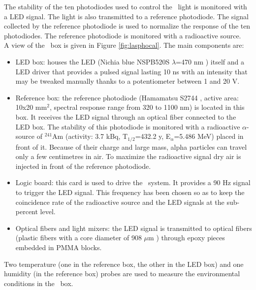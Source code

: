 The stability of the ten photodiodes used to control the \laser~light is monitored with a LED signal. The light is also transmitted to a reference photodiode. The signal collected by the reference photodiode is used to normalize the response of the ten photodiodes. The reference photodiode is monitored with a radioactive source.\\
A view of the \phocal~box is given in Figure \ref{fig:lasphocal}. The main components are:
\begin{itemize}
\item LED box: houses the LED (Nichia blue NSPB520S $\lambda$=470 nm \cite{ref:led}) itself and a LED driver that provides a pulsed signal lasting 10 ns with an intensity that may be tweaked manually thanks to a potentiometer between 1 and 20 V.
\item Reference box: the reference photodiode (Hamamatsu S2744 \cite{ref:bigphoto}, active area: 10x20 mm$^2$,  spectral response range from 320 to 1100 nm) is located in this box. It receives the LED signal through an optical fiber connected to the LED box. The stability of this photodiode is monitored with a radioactive $\alpha$-source of $^{241}$Am (activity: 3.7 kBq, T$_{1/2}$=432.2 y, E$_{\alpha}$=5.486 MeV) placed in front of it. Because of their charge and large mass, alpha particles can travel only a few centimetres in air. To maximize the radioactive signal dry air is injected in front of the reference photodiode.
\item Logic board: this card is used to drive the \phocal~system. It provides a 90 Hz signal to trigger the LED signal. This frequency has been chosen so as to keep the coincidence rate of the radioactive source and the LED signals at the sub-percent level.
\item Optical fibers and light mixers: the LED signal is transmitted to optical fibers (plastic fibers with a core diameter of 908 $\mu$m \cite{ref:fibers}) through epoxy pieces embedded in PMMA blocks.
\end{itemize}
Two temperature (one in the reference box, the other in the LED box) and one humidity (in the reference box) probes are used to measure the environmental conditions in the \phocal~box. 

